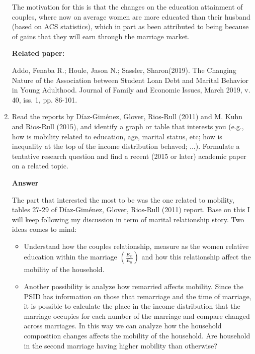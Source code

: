\documentclass[12pt]{article}%
\begin{document}
\begin{enumerate}
	The motivation for this is that the changes on the education attainment of couples, where now on average women are more educated than their husband (based on ACS statistics), which in part as been attributed to being because of gains that they will earn through the marriage market. 
	
	\textbf{Related paper:}
	
	Addo, Fenaba R.; Houle, Jason N.; Sassler, Sharon(2019). The Changing Nature of the Association between Student Loan Debt and Marital Behavior in Young Adulthood. 
	Journal of Family and Economic Issues, March 2019, v. 40, iss. 1, pp. 86-101.
	
	\item Read the reports by Díaz-Giménez, Glover, Rios-Rull (2011) and M. Kuhn and Rios-Rull (2015), and identify a graph or table that interests you
	(e.g., how is mobility related to education, age, marital status, etc; how is inequality at the top of the income distribution behaved; ...). Formulate a tentative research question and find a recent (2015 or later) academic  paper on a related topic.
	
		    	\vspace{3mm}
	
	{\bf Answer}   	
	
	\vspace{3mm}
	
	The part that interested the most to be was the one related to mobility, tables 27-29 of Díaz-Giménez, Glover, Rios-Rull (2011) report. Base on this I will keep following my discussion in term of marital relationship story. Two ideas comes to mind:
	
 \begin{itemize}
 	\item Understand how the couples relationship, measure as the women relative education within the marriage $\left( \frac{E_w}{E_h}\right) $ and how this relationship affect the mobility of the household. 
 	
 	\item Another possibility is analyze how remarried affects mobility. Since the PSID has information on those that remarriage and the time of marriage, it is possible to calculate the place in the income distribution that the marriage occupies for each number of the marriage and compare changed across marriages. In this way we can analyze how the household composition changes affects the mobility of the household. Are household in the second marriage having higher mobility than otherwise? 
 	

\end{itemize}
\end{enumerate}
\end{document}
